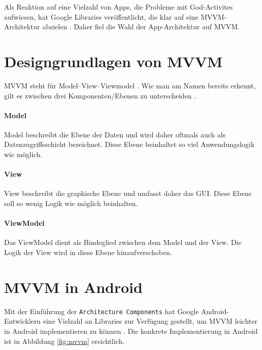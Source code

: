 Als Reaktion auf eine Vielzahl von Apps, die Probleme mit God-Activites
aufwiesen, hat Google Libraries veröffentlicht, die klar auf eine
MVVM-Architektur abzielen \cite{mvvm}. Daher fiel die Wahl der
App-Architektur auf MVVM.

\hypertarget{designgrundlagen-von-mvvm}{%
\section{Designgrundlagen von MVVM}\label{designgrundlagen-von-mvvm}}

MVVM steht für Model--View--Viewmodel \cite{mvvm-wiki}. Wie man am Namen
bereits erkennt, gilt es zwischen drei Komponenten/Ebenen zu
unterscheiden \cite{mvvm-article}.

\hypertarget{model}{%
\paragraph{Model}\label{model}}

Model beschreibt die Ebene der Daten und wird daher oftmals auch als
Datenzugriffsschicht bezeichnet. Diese Ebene beinhaltet so viel
Anwendungslogik wie möglich.

\hypertarget{view}{%
\paragraph{View}\label{view}}

View beschreibt die graphische Ebene und umfasst daher das GUI. Diese
Ebene soll so wenig Logik wie möglich beinhalten.

\hypertarget{viewmodel}{%
\paragraph{ViewModel}\label{viewmodel}}

Das ViewModel dient als Bindeglied zwischen dem Model und der View. Die
Logik der View wird in diese Ebene hinaufverschoben.

\hypertarget{mvvm-in-android}{%
\section{MVVM in Android}\label{mvvm-in-android}}

Mit der Einführung der \texttt{Architecture\ Components} hat Google
Android-Entwicklern eine Vielzahl an Libraries zur Verfügung gestellt,
um MVVM leichter in Android implementieren zu können
\cite{mvvm-architecture-components}. Die konkrete Implementierung in
Android ist in Abbildung \ref{fig:mvvm} ersichtlich.

